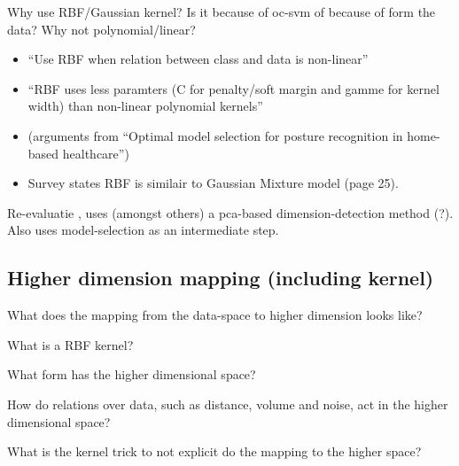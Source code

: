 Why use RBF/Gaussian kernel? Is it because of \gls{oc-svm} of because of form the data? Why not polynomial/linear?
\begin{itemize}
  \item ``Use RBF when relation between class and data is non-linear''
  \item ``RBF uses less paramters (C for penalty/soft margin and gamme for kernel width) than non-linear polynomial kernels''
  \item (arguments from \cite{zhang2011optimal} ``Optimal model selection for posture recognition in home-based healthcare'')
  \item Survey \cite{hodge2004survey} states RBF is similair to Gaussian Mixture model (page 25).
\end{itemize}





Re-evaluatie \cite{guo2012adaptive}, uses (amongst others) a pca-based dimension-detection method (?).
Also uses model-selection as an intermediate step.


\subsection{Higher dimension mapping (including kernel)}
What does the mapping from the data-space to higher dimension looks like?

What is a RBF kernel?

What form has the higher dimensional space?

How do relations over data, such as distance, volume and noise, act in the higher dimensional space?

What is the kernel trick to not explicit do the mapping to the higher space?




